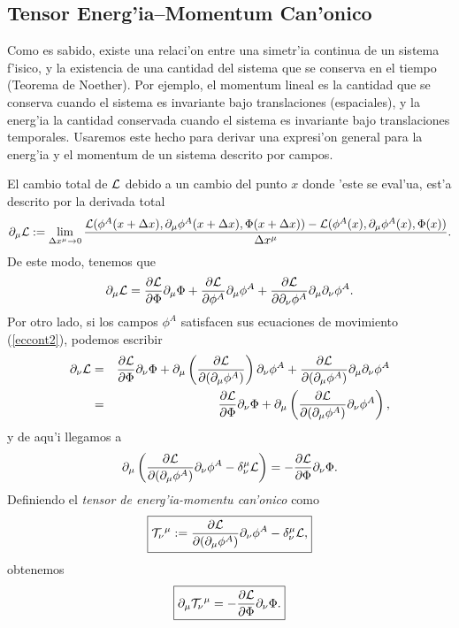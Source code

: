 \subsection{Tensor Energ'ia--Momentum Can'onico}\label{sectem}

Como es sabido, existe una relaci'on entre una simetr'ia continua de un sistema
f'isico, y la existencia de una cantidad del sistema que se conserva en el tiempo (Teorema de Noether).
Por ejemplo, el momentum lineal es la cantidad que se conserva cuando el sistema
es invariante bajo translaciones (espaciales), y la energ'ia la cantidad conservada
cuando el sistema es invariante bajo translaciones temporales. Usaremos este hecho para derivar
una expresi'on general para la energ'ia y el momentum de un sistema descrito por campos.

El cambio total de $\cal L$ debido a un cambio del punto $x$ donde 'este se
eval'ua, est'a descrito por la derivada total
\begin{equation}
\partial_\mu{\cal L}:=\lim_{{\Delta x^\mu}\rightarrow 0}\frac{{\cal
L}(\phi^A(x+\Delta x),\partial_\mu\phi^A(x+\Delta x),\Phi(x+\Delta x))-{\cal
L}(\phi^A(x),\partial_\mu\phi^A(x),\Phi(x))}{\Delta x^\mu}.
\end{equation}
De este modo, tenemos que
\begin{equation}
\partial_{\mu }{\cal L}=\frac{\partial {\cal L}}{\partial \Phi
}\partial_\mu\Phi+\frac{\partial {\cal L}}{\partial \phi ^{A}}\partial_{\mu
}\phi^{A}+\frac{\partial {\cal L}}{\partial
\partial_\nu\phi^{A}}\partial_\mu\partial_\nu \phi^{A} .
\end{equation}
Por otro lado, si los campos $\phi^A$ satisfacen sus ecuaciones de movimiento
(\ref{eccont2}), podemos escribir
\begin{eqnarray}
\partial_\nu {\cal L}&=&\frac{\partial {\cal L}}{\partial \Phi
}\partial_\nu\Phi +\partial _{\mu }\left( \frac{\partial {\cal L}}{\partial
(\partial_\mu\phi ^{A})}\right) \partial_\nu\phi^{A}+\frac{\partial {\cal
L}}{\partial (\partial_\mu\phi^{A})}\partial_\mu\partial_\nu \phi^{A} \\
&=&\frac{\partial {\cal L}}{\partial \Phi }\partial_\nu \Phi +\partial _{\mu
}\left( \frac{\partial {\cal L}}{\partial (\partial_\mu\phi^{A})}\partial_\nu
\phi^{A}\right) ,
\end{eqnarray}
y de aqu'i llegamos a
\begin{equation}
\partial _{\mu }\left( \frac{\partial {\cal L}}{\partial (\partial_{\mu
}\phi^{A})}\partial_\nu\phi^{A}-\delta _\nu ^\mu {\cal L}\right)
=-\frac{\partial {\cal L}}{\partial \Phi }\partial_\nu \Phi  .
\end{equation}
Definiendo el \textit{tensor de energ'ia-momentu can'onico} como
\begin{equation}
\boxed{{\cal T}_\nu {}^\mu := \frac{\partial {\cal L}}{\partial (\partial_{\mu
}\phi^{A})}\partial_\nu\phi^{A}-\delta _\nu ^\mu {\cal L} ,} \label{temc}
\end{equation}
obtenemos
\begin{equation}
\boxed{\partial _{\mu }{\cal T}_\nu{}^\mu =-\frac{\partial {\cal
L}}{\partial\Phi }\partial_\nu\Phi .} \label{cce}
\end{equation}

